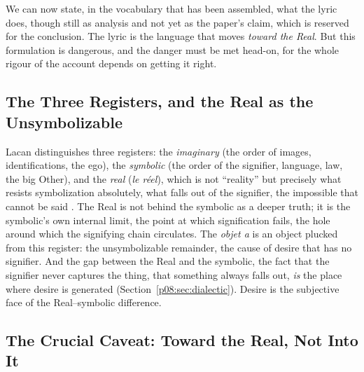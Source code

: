We can now state, in the vocabulary that has been assembled, what the lyric does, though still as analysis and not yet as the paper's claim, which is reserved for the conclusion. The lyric is the language that moves \emph{toward the Real}. But this formulation is dangerous, and the danger must be met head-on, for the whole rigour of the account depends on getting it right.

\subsection{The Three Registers, and the Real as the Unsymbolizable}

Lacan distinguishes three registers: the \emph{imaginary} (the order of images, identifications, the ego), the \emph{symbolic} (the order of the signifier, language, law, the big Other), and the \emph{real} (\textit{le réel}), which is not ``reality'' but precisely what resists symbolization absolutely, what falls out of the signifier, the impossible that cannot be said \parencite{lacan1977ecrits, lacan1998seminarxi}. The Real is not behind the symbolic as a deeper truth; it is the symbolic's own internal limit, the point at which signification fails, the hole around which the signifying chain circulates. The \textit{objet a} is an object plucked from this register: the unsymbolizable remainder, the cause of desire that has no signifier. And the gap between the Real and the symbolic, the fact that the signifier never captures the thing, that something always falls out, \emph{is} the place where desire is generated (Section~\ref{p08:sec:dialectic}). Desire is the subjective face of the Real--symbolic difference.

\subsection{The Crucial Caveat: Toward the Real, Not Into It}

